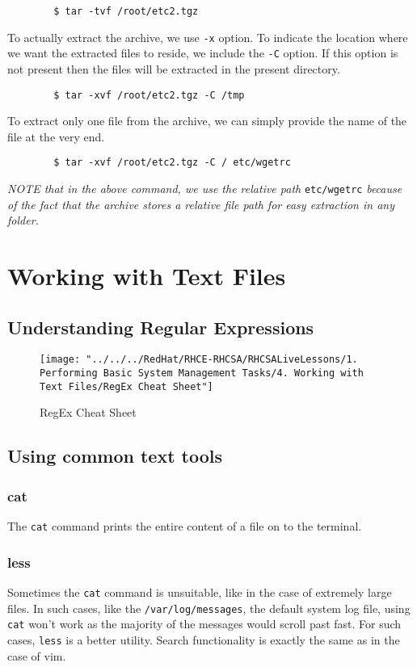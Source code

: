 \documentclass{report}
\begin{document}
	\begin{verbatim}
		$ tar -tvf /root/etc2.tgz
	\end{verbatim}
	
	\noindent
	To actually extract the archive, we use \verb|-x| option. To indicate the location where we want the extracted files to reside, we include the \verb|-C| option. If this option is not present then the files will be extracted in the present directory. 
	
	\begin{verbatim}
		$ tar -xvf /root/etc2.tgz -C /tmp
	\end{verbatim}
	
	\noindent
	To extract only one file from the archive, we can simply provide the name of the file at the very end. 
	
	\begin{verbatim}
		$ tar -xvf /root/etc2.tgz -C / etc/wgetrc
	\end{verbatim}
	
	\noindent
	\textit{NOTE that in the above command, we use the relative path} \verb|etc/wgetrc| \textit{because of the fact that the archive stores a relative file path for easy extraction in any folder.}
	
	\chapter{Working with Text Files}
	\section{Understanding Regular Expressions}
	\begin{figure}[h]
		\centering
		\texttt{[image: "../../../RedHat/RHCE-RHCSA/RHCSALiveLessons/1. Performing Basic System Management Tasks/4. Working with Text Files/RegEx Cheat Sheet"]}
		\caption{RegEx Cheat Sheet}
		\label{fig:regex-cheat-sheet}
	\end{figure}

	\section{Using common text tools}
	\subsection{cat}
	The \verb|cat| command prints the entire content of a file on to the terminal. 
	
	\subsection{less}
	Sometimes the \verb|cat| command is unsuitable, like in the case of extremely large files. In such cases, like the \verb|/var/log/messages|, the default system log file, using \verb|cat| won't work as the majority of the messages would scroll past fast. For such cases, \verb|less| is a better utility. Search functionality is exactly the same as in the case of vim. 
	
\end{document}
